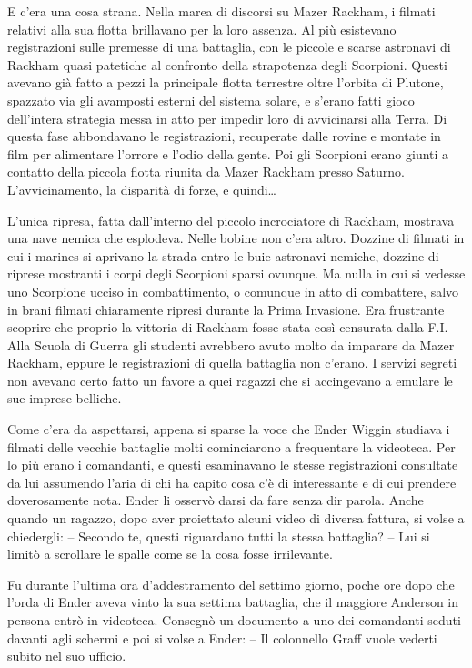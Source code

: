 {E c'era una cosa strana. Nella marea di discorsi su Mazer Rackham, i
	filmati relativi alla sua flotta brillavano per la loro assenza. Al più
	esistevano registrazioni sulle premesse di una battaglia, con le piccole
	e scarse astronavi di Rackham quasi patetiche al confronto della
	strapotenza degli Scorpioni. Questi avevano già fatto a pezzi la
	principale flotta terrestre oltre l'orbita di Plutone, spazzato via gli
	avamposti esterni del sistema solare, e s'erano fatti gioco dell'intera
	strategia messa in atto per impedir loro di avvicinarsi alla Terra. Di
	questa fase abbondavano le registrazioni, recuperate dalle rovine e
	montate in film per alimentare l'orrore e l'odio della gente. Poi gli
	Scorpioni erano giunti a contatto della piccola flotta riunita da Mazer
	Rackham presso Saturno. L'avvicinamento, la disparità di forze, e
	quindi\ldots{}}

{L'unica ripresa, fatta dall'interno del piccolo incrociatore di
	Rackham, mostrava una nave nemica che esplodeva. Nelle bobine non c'era
	altro. Dozzine di filmati in cui i marines si aprivano la strada entro
	le buie astronavi nemiche, dozzine di riprese mostranti i corpi degli
	Scorpioni sparsi ovunque. Ma nulla in cui si vedesse uno Scorpione
	ucciso in combattimento, o comunque in atto di combattere, salvo in
	brani filmati chiaramente ripresi durante la Prima Invasione. Era
	frustrante scoprire che proprio la vittoria di Rackham fosse stata così
	censurata dalla F.I. Alla Scuola di Guerra gli studenti avrebbero avuto
	molto da imparare da Mazer Rackham, eppure le registrazioni di quella
	battaglia non c'erano. I servizi segreti non avevano certo fatto un
	favore a quei ragazzi che si accingevano a emulare le sue imprese
	belliche.}

{Come c'era da aspettarsi, appena si sparse la voce che Ender Wiggin
	studiava i filmati delle vecchie battaglie molti cominciarono a
	frequentare la videoteca. Per lo più erano i comandanti, e questi
	esaminavano le stesse registrazioni consultate da lui assumendo l'aria
	di chi ha capito cosa c'è di interessante e di cui prendere
	doverosamente nota. Ender li osservò darsi da fare senza dir parola.
	Anche quando un ragazzo, dopo aver proiettato alcuni video di diversa
	fattura, si volse a chiedergli: -- Secondo te, questi riguardano tutti
	la stessa battaglia? -- Lui si limitò a scrollare le spalle come se la
	cosa fosse irrilevante.}

{Fu durante l'ultima ora d'addestramento del settimo giorno, poche ore
	dopo che l'orda di Ender aveva vinto la sua settima battaglia, che il
	maggiore Anderson in persona entrò in videoteca. Consegnò un documento a
	uno dei comandanti seduti davanti agli schermi e poi si volse a Ender:
	-- Il colonnello Graff vuole vederti subito nel suo ufficio.}

